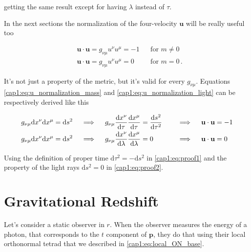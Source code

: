getting the same result except for having $\lambda$ instead of $\tau$.

In the next sections the normalization of the four-velocity $\mathbf u$ will be
really useful too

\begin{subequations}
    \begin{align}
        &\mathbf{u \cdot u} = g_{\nu \mu} u^\nu u^\mu = -1 
        &&\text{for } m \neq 0 \label{cap1:eq:u_normalization_mass} \\
        &\mathbf{u \cdot u} = g_{\nu \mu} u^\nu u^\mu = 0 
        &&\text{for } m = 0 \label{cap1:eq:u_normalization_light} \, .
    \end{align}
    \label{cap1:eq:u_normalization}
\end{subequations}

It's not just a property of the metric, but it's valid for every $g_{\nu \mu}$.
Equations \ref{cap1:eq:u_normalization_mass} and
\ref{cap1:eq:u_normalization_light} can be respectively derived like this

\begin{subequations}
\begin{align}
    g_{\nu \mu} \mathrm{d}x^\nu \mathrm{d}x^\mu = \mathrm{d}s^2
    \quad &\implies \quad
    g_{\nu \mu} \dv{x^\nu}{\tau} \dv{x^\mu}{\tau} = \dv{s^2}{\tau^2}
    \quad &&\implies \quad
    \mathbf{u \cdot u} = -1 \label{cap1:eq:proof1} \\
    g_{\nu \mu} \mathrm{d}x^\nu \mathrm{d}x^\mu = \mathrm{d}s^2
    \quad &\implies \quad
    g_{\nu \mu} \dv{x^\nu}{\lambda} \dv{x^\mu}{\lambda} = 0
    \quad &&\implies \quad
    \mathbf{u \cdot u} = 0 \label{cap1:eq:proof2}
\end{align}
\end{subequations}

Using the definition of proper time $\mathrm{d}\tau^2 = - \mathrm{d}s^2$ in
\ref{cap1:eq:proof1} and the property of the light rays $\mathrm{d}s^2 = 0$ in
\ref{cap1:eq:proof2}.


\section{Gravitational Redshift}

Let's consider a static observer in $r$.
When the observer measures the energy of a photon, that corresponds to the $t$
component of $\mathbf{p}$, they do that using their local orthonormal tetrad
that we described in \ref{cap1:eq:local_ON_base}.

